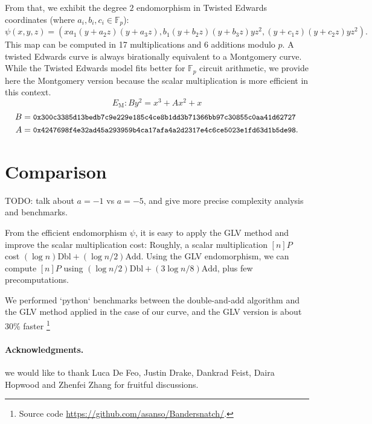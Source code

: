 \documentclass{amsart}
\newcommand{\SM}[1]{\color{blue}#1\color{black}}
\newcommand{\Fp}{\ensuremath{\mathbb F_p}}
\begin{document}
From that, we exhibit the degree $2$ endomorphism in Twisted Edwards
coordinates (where $a_i, b_i, c_i \in \Fp$):
$$\psi(x,y,z) = (xa_1(y+a_2z)(y+a_3z), b_1(y+b_2z)(y+b_3z)yz^2,
(y+c_1z)(y+c_2z)yz^2).$$
This map can be computed in 17 multiplications and 6 additions modulo $p$.
A twisted Edwards curve is always birationally equivalent to a
Montgomery curve.
While the Twisted Edwards model fits better for $\mathbb F_p$ circuit
arithmetic, we provide here the Montgomery version because the scalar
multiplication is more efficient in this context.
$$E_\text{M}: By^2 = x^3 + Ax^2 + x$$
\begin{align*}
  B &= \text{\small{\tt 0x300c3385d13bedb7c9e229e185c4ce8b1dd3b71366bb97c30855c0aa41d62727}}\\
  A &= \text{\small{\tt 0x4247698f4e32ad45a293959b4ca17afa4a2d2317e4c6ce5023e1fd63d1b5de98}}.
\end{align*}


\section{Comparison}

\SM{TODO: talk about $a=-1$ vs $a=-5$, and give more precise complexity
analysis and benchmarks.}

From the efficient endomorphism $\psi$, it is easy to apply the GLV method and improve the scalar multiplication cost:
Roughly, a scalar multiplication $[n]P$ cost $(\log n) \text{Dbl} + (\log n/2) \text{Add}$.
Using the GLV endomorphism, we can compute $[n]P$ using $(\log n/2 )\text{Dbl} + (3\log n/8) \text{Add}$, plus few precomputations.

We performed `python` benchmarks between the double-and-add algorithm and the GLV method applied in the case of our curve, and the GLV version is about 30\% faster 
\footnote{Source code \url{https://github.com/asanso/Bandersnatch/}.}

\bigskip
\paragraph*{\textbf{Acknowledgments.}} we would like to thank Luca De Feo, Justin Drake, Dankrad Feist, Daira Hopwood and Zhenfei Zhang for fruitful discussions.



\end{document}

